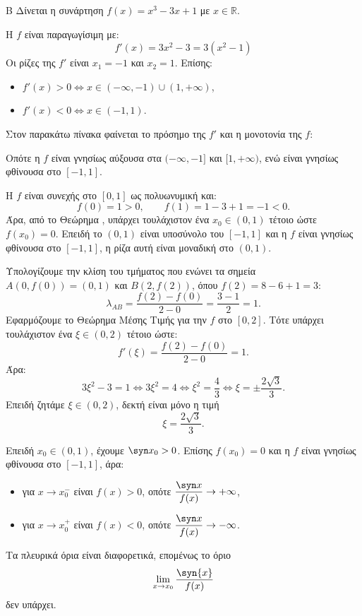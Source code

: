 \begin{thema}{Β}
Δίνεται η συνάρτηση $f(x) = x^3 - 3x + 1$ με $x \in \mathbb{R}$.
\begin{erwthma}
\item Η $f$ είναι παραγωγίσιμη με:
\[ f'(x) = 3x^2 - 3 = 3(x^2 - 1) \]
Οι ρίζες της $f'$ είναι $x_1=-1$ και $x_2=1$.
Επίσης:
\begin{itemize}
\item $f'(x) > 0 \Leftrightarrow x \in (-\infty, -1) \cup (1, +\infty)$,
\item $f'(x) < 0 \Leftrightarrow x \in (-1, 1)$.
\end{itemize}
Στον παρακάτω πίνακα φαίνεται το πρόσημο της $f'$ και η μονοτονία της $f$:
\begin{center}
\end{center}
Οπότε η $f$ είναι γνησίως αύξουσα στα $(-\infty, -1]$ και $[1, +\infty)$, ενώ είναι γνησίως φθίνουσα στο $[-1, 1]$.

\item Η $f$ είναι συνεχής στο $[0,1]$ ως πολυωνυμική και:
\[ f(0)=1>0,\qquad f(1)=1-3+1=-1<0. \]
Άρα, από το Θεώρημα , υπάρχει τουλάχιστον ένα $x_0\in(0,1)$ τέτοιο ώστε $f(x_0)=0$.
Επειδή το $(0,1)$ είναι υποσύνολο του $[-1,1]$ και η $f$ είναι γνησίως φθίνουσα στο $[-1,1]$, η ρίζα αυτή είναι μοναδική στο $(0,1)$.

\item Υπολογίζουμε την κλίση του τμήματος που ενώνει τα σημεία $A(0, f(0)) = (0, 1)$ και $B(2, f(2))$, όπου $f(2)=8-6+1=3$:
\[ \lambda_{AB} = \frac{f(2) - f(0)}{2 - 0} = \frac{3 - 1}{2} = 1. \]
Εφαρμόζουμε το Θεώρημα Μέσης Τιμής για την $f$ στο $[0,2]$. Τότε υπάρχει τουλάχιστον ένα $\xi \in (0,2)$ τέτοιο ώστε:
\[ f'(\xi)=\frac{f(2)-f(0)}{2-0}=1. \]
Άρα:
\[ 3\xi^2 - 3 = 1 \Leftrightarrow 3\xi^2 = 4 \Leftrightarrow \xi^2 = \frac{4}{3} \Leftrightarrow \xi = \pm \frac{2\sqrt{3}}{3}. \]
Επειδή ζητάμε $\xi \in (0,2)$, δεκτή είναι μόνο η τιμή
\[ \xi = \frac{2\sqrt{3}}{3}. \]

\item Επειδή $x_0\in(0,1)$, έχουμε $\syn x_0>0$. Επίσης $f(x_0)=0$ και η $f$ είναι γνησίως φθίνουσα στο $[-1,1]$, άρα:
\begin{itemize}
\item για $x\to x_0^-$ είναι $f(x)>0$, οπότε $\dfrac{\syn x}{f(x)}\to +\infty$,
\item για $x\to x_0^+$ είναι $f(x)<0$, οπότε $\dfrac{\syn x}{f(x)}\to -\infty$.
\end{itemize}
Τα πλευρικά όρια είναι διαφορετικά, επομένως το όριο
\[ \lim\limits_{x\to x_0}{\dfrac{\syn{x}}{f(x)}} \]
δεν υπάρχει.
\end{erwthma}
\end{thema}

